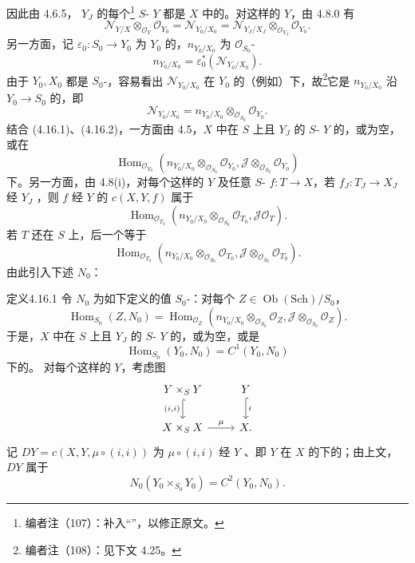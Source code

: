 因此由 4.6.5， $Y_J$ 的每个\footnote{编者注（107）：补入“”，以修正原文。} $S$- $Y$ 都是 $X$ 中的。对这样的 $Y$，由 4.8.0 有
\[\mathscr N_{Y/X}\otimes_{\mathscr O_Y}\mathscr O_{Y_0}=\mathscr N_{Y_0/X_0}=\mathscr N_{Y_J/X_J}\otimes_{\mathscr O_{Y_J}}\mathscr O_{Y_0}.\tag{4.16.1}\]
另一方面，记 $\varepsilon_0:S_0\to Y_0$ 为 $Y_0$ 的，$n_{Y_0/X_0}$ 为 $\mathscr O_{S_0}$-
\[n_{Y_0/X_0}=\varepsilon_0^*(\mathscr N_{Y_0/X_0}).\]
由于 $Y_0,X_0$ 都是 $S_0$-，容易看出 $\mathscr N_{Y_0/X_0}$ 在 $Y_0$ 的（例如）下，故\footnote{编者注（108）：见下文 4.25。}它是 $n_{Y_0/X_0}$ 沿 $Y_0\to S_0$ 的，即
\[\mathscr N_{Y_0/X_0}=n_{Y_0/X_0}\otimes_{\mathscr O_{S_0}}\mathscr O_{Y_0}.\tag{4.16.2}\]
结合 (4.16.1)、(4.16.2)，一方面由 4.5，$X$ 中在 $S$ 上且 $Y_J$ 的 $S$- $Y$ 的，或为空，或在
\[\operatorname{Hom}_{\mathscr O_{Y_0}}(n_{Y_0/X_0}\otimes_{\mathscr O_{S_0}}\mathscr O_{Y_0},\mathscr J\otimes_{\mathscr O_{S_0}}\mathscr O_{Y_0})\tag{4.16.3}\]
下。另一方面，由 4.8(i)，对每个这样的 $Y$ 及任意 $S$- $f:T\to X$，若 $f_J:T_J\to X_J$ 经 $Y_J$ ，则 $f$ 经 $Y$ 的 $c(X,Y,f)$ 属于
\[\operatorname{Hom}_{\mathscr O_{T_0}}(n_{Y_0/X_0}\otimes_{\mathscr O_{S_0}}\mathscr O_{T_0},\mathscr J\mathscr O_T).\]
若 $T$ 还在 $S$ 上，后一个等于
\[\operatorname{Hom}_{\mathscr O_{T_0}}(n_{Y_0/X_0}\otimes_{\mathscr O_{S_0}}\mathscr O_{T_0},\mathscr J\otimes_{\mathscr O_{S_0}}\mathscr O_{T_0}).\]
由此引入下述 $N_0$：
\begin{SGAresult}{定义}{4.16.1}
令 $N_0$ 为如下定义的值 $S_0$-：对每个 $Z\in\operatorname{Ob}(\mathrm{Sch})/S_0$，
\[\operatorname{Hom}_{S_0}(Z,N_0)=\operatorname{Hom}_{\mathscr O_Z}(n_{Y_0/X_0}\otimes_{\mathscr O_{S_0}}\mathscr O_Z,\mathscr J\otimes_{\mathscr O_{S_0}}\mathscr O_Z).\tag{$*$}\]
于是，$X$ 中在 $S$ 上且 $Y_J$ 的 $S$- $Y$ 的，或为空，或是
\[\operatorname{Hom}_{S_0}(Y_0,N_0)=C^1(Y_0,N_0)\]
下的。
对每个这样的 $Y$，考虑图
\[
\begin{tikzcd}
Y\times_S Y\arrow[d,hook,"{(i,i)}"']&Y\arrow[d,hook,"i"]\\
X\times_S X\arrow[r,"\mu"]&X.
\end{tikzcd}
\]
记 $DY=c(X,Y,\mu\circ(i,i))$ 为 $\mu\circ(i,i)$ 经 $Y$ 、即 $Y$ 在 $X$ 的下的；由上文，$DY$ 属于
\[N_0(Y_0\times_{S_0}Y_0)=C^2(Y_0,N_0).\]
\end{SGAresult}
